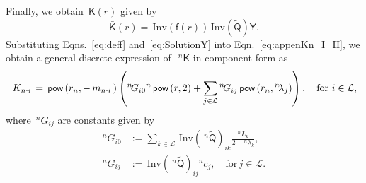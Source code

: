 \documentclass[preprint,12pt,times]{elsarticle}
\numberwithin{equation}{section}
\renewcommand{\u}[1]{\boldsymbol{#1}}
\newcommand{\usf}[1]{\u{\mathsf #1}}
\newcommand{\busf}[1]{\bar{\usf{ #1}}}
\newcommand{\pr}[1]{\left( #1 \right)}
\newcommand{\p}{\,\textsf{\small pow}}
\newcommand{\Inv}{\,\mathrm{Inv}}
\newcommand{\msub}[2]{
\IfEqCase{#2}{
      {i}{\, m_{#1\cdot #2}\,}%
  }[\,m_{#1\cdot {\scriptscriptstyle #2}}\,]}
\newcommand{\Ksub}[2]{\,K_{ {#1}\cdot {\scriptscriptstyle #2}}\,}
\renewcommand{\>}{$\Rightarrow$}
\begin{document}
Finally, we obtain~$\busf{K}(r)$ given by
\begin{equation}
\busf{K}(r)  = \Inv\pr{\usf{f}(r)} \Inv\pr{\tilde{\usf{Q}}}\usf{Y}.
\label{eq:appenKn_I_II}
\end{equation}
Substituting Eqns.~\eqref{eq:deff} and~\eqref{eq:SolutionY} into Eqn.~\eqref{eq:appenKn_I_II}, we obtain a general discrete expression of~$~^{n}{\usf{K}}$ in component form as
\begin{equation}
\Ksub{n}{i} = \p\pr{r_{n},-\msub{n}{i}} \left( {}^{n}\!G_{i0} {}^{n} \p\pr{r,2} + \sum_{j \in \mathcal{L}} {}^{n}\!G_{ij} \p\pr{r_{n},{}^{n}\!{\lambda_{j}}} \right) , \quad \text{for~$i \in \mathcal{L}$},
\label{eq:appenKn}
\end{equation}
where~${}^{n}\!G_{ij}$ are constants given by
\begin{subequations}
\begin{align}
	{}^{n}\!G_{i0}& := \sum_{k \in \mathcal{L}} \Inv\pr{~^{n}\tilde{\usf{Q}}}_{ik} \frac{{}^{n}\!L_{k}}{2 - {}^{n}\!\lambda_{k}}, \\
	{}^{n}\!G_{ij}& := \Inv\pr{~^{n}\tilde{\usf{Q}}}_{ij} {}^{n}\!c_{j}, \quad \text{for}\, j\in \mathcal{L} .
\end{align}
\label{eq:Gjin}
\end{subequations}

\newpage



\end{document}
